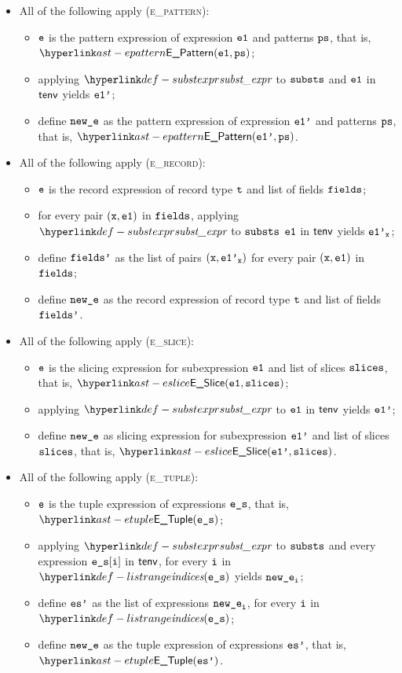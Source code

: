\begin{itemize}
  \item All of the following apply (\textsc{e\_pattern}):
  \begin{itemize}
    \item $\texttt{e}$ is the pattern expression of expression $\texttt{e1}$ and patterns $\texttt{ps}$, that is, \\
          $\EPattern(\veone, \vps)$;
    \item applying $\substexpr$ to $\texttt{substs}$ and $\texttt{e1}$ in $\textsf{tenv}$ yields $\texttt{e1'}$;
    \item define $\texttt{new\_e}$ as the pattern expression of expression $\texttt{e1'}$ and patterns $\texttt{ps}$, that is, $\EPattern(\veonep, \vps)$.
  \end{itemize}

  \item All of the following apply (\textsc{e\_record}):
  \begin{itemize}
    \item $\texttt{e}$ is the record expression of record type $\texttt{t}$ and list of fields $\texttt{fields}$;
    \item for every pair $(\texttt{x},\texttt{e1})$ in $\texttt{fields}$, applying $\substexpr$ to $\texttt{substs}$ $\texttt{e1}$ in $\textsf{tenv}$ yields $\texttt{e1'}_{\texttt{x}}$;
    \item define $\texttt{fields'}$ as the list of pairs $(\texttt{x},\texttt{e1'}_{\texttt{x}})$ for every pair $(\texttt{x},\texttt{e1})$ in $\texttt{fields}$;
    \item define $\texttt{new\_e}$ as the record expression of record type $\texttt{t}$ and list of fields $\texttt{fields'}$.
  \end{itemize}

  \item All of the following apply (\textsc{e\_slice}):
  \begin{itemize}
    \item $\texttt{e}$ is the slicing expression for subexpression $\texttt{e1}$ and list of slices $\texttt{slices}$, that is, $\ESlice(\veone, \vslices)$;
    \item applying $\substexpr$ to $\texttt{e1}$ in $\textsf{tenv}$ yields $\texttt{e1'}$;
    \item define $\texttt{new\_e}$ as slicing expression for subexpression $\texttt{e1'}$ and list of slices $\texttt{slices}$, that is, $\ESlice(\veonep, \vslices)$.
  \end{itemize}

  \item All of the following apply (\textsc{e\_tuple}):
  \begin{itemize}
    \item $\texttt{e}$ is the tuple expression of expressions $\texttt{e\_s}$, that is, $\ETuple(\ves)$;
    \item applying $\substexpr$ to $\texttt{substs}$ and every expression $\texttt{e\_s}[\texttt{i}]$ in $\textsf{tenv}$, for every $\texttt{i}$ in $\listrange(\ves)$
          yields $\texttt{new\_e}_{\texttt{i}}$;
    \item define $\texttt{es'}$ as the list of expressions $\texttt{new\_e}_{\texttt{i}}$, for every $\texttt{i}$ in $\listrange(\ves)$;
    \item define $\texttt{new\_e}$ as the tuple expression of expressions $\texttt{es'}$, that is, $\ETuple(\vesp)$.
  \end{itemize}


\end{itemize}
